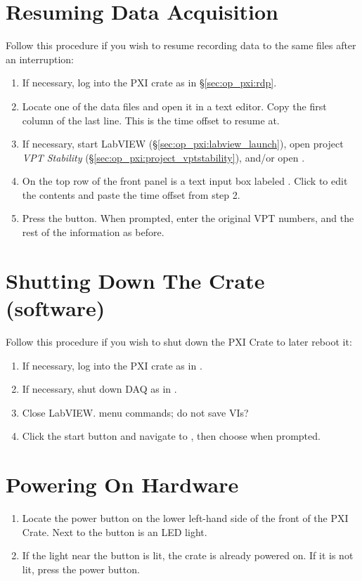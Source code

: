 \section{Resuming Data Acquisition}
\label{sec:op_pxi:daq_resume}

Follow this procedure if you wish to resume recording data to the same files after an interruption:
\begin{enumerate}
\item If necessary, log into the PXI crate as in \S\ref{sec:op_pxi:rdp}.
\item Locate one of the data files and open it in a text editor.  Copy the first column of the last line.  This is the time offset to resume at.
\item If necessary, start LabVIEW (\S\ref{sec:op_pxi:labview_launch}), open project \textit{VPT Stability} (\S\ref{sec:op_pxi:project_vptstability}), and/or open .
\item On the top row of the  front panel is a text input box labeled .  Click to edit the contents and paste the time offset from step 2.
\item Press the   button.  When prompted, enter the original VPT numbers, and the rest of the information as before.
\end{enumerate}


\section{Shutting Down The Crate (software)}
\label{sec:op_pxi:shutdown_software}

Follow this procedure if you wish to shut down the PXI Crate to later reboot it:
\begin{enumerate}
\item If necessary, log into the PXI crate as in .
\item If necessary, shut down DAQ as in .
\item Close LabVIEW.  \FIXME{} menu commands; do not save VIs?
\item \FIXME{} Click the start button and navigate to , then choose  when prompted.
\end{enumerate}

\section{Powering On Hardware}
\label{sec:op_pxi:poweron}
\begin{enumerate}
\item Locate the power button on the lower left-hand side of the front of the PXI Crate.  Next to the button is an LED light.
\item If the light near the button is lit, the crate is already powered on.  If it is not lit, press the power button.
\end{enumerate}


